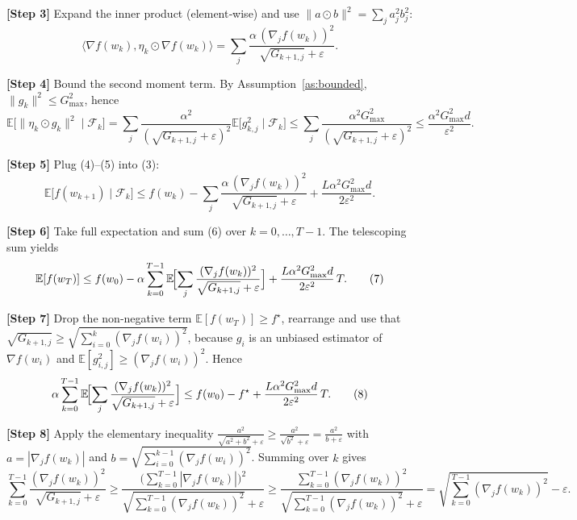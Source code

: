 \documentclass{article}
\newcommand{\E}{\mathbb{E}}
\begin{document}
\noindent\textbf{[Step 3]} Expand the inner product (element‑wise) and use
$\|a\odot b\|^{2}=\sum_{j}a_{j}^{2}b_{j}^{2}$:
\[
\langle\nabla f(w_{k}),\eta_{k}\odot\nabla f(w_{k})\rangle
   =\sum_{j}\frac{\alpha\,(\nabla_{j}f(w_{k}))^{2}}
                {\sqrt{G_{k+1,j}}+\varepsilon}.                                   \tag{4}
\]

\noindent\textbf{[Step 4]} Bound the second moment term.  By Assumption~\ref{as:bounded},
$\|g_{k}\|^{2}\le G_{\max}^{2}$, hence
\[
\E\!\bigl[\|\eta_{k}\odot g_{k}\|^{2}\mid\mathcal{F}_{k}\bigr]
   =\sum_{j}\frac{\alpha^{2}}{(\sqrt{G_{k+1,j}}+\varepsilon)^{2}}
          \E\!\bigl[g_{k,j}^{2}\mid\mathcal{F}_{k}\bigr]
   \le\sum_{j}\frac{\alpha^{2}G_{\max}^{2}}{(\sqrt{G_{k+1,j}}+\varepsilon)^{2}}
   \le\frac{\alpha^{2}G_{\max}^{2}d}{\varepsilon^{2}}.                              \tag{5}
\]

\noindent\textbf{[Step 5]} Plug (4)–(5) into (3):
\[
\E\!\bigl[f(w_{k+1})\mid\mathcal{F}_{k}\bigr]
\le f(w_{k})
   -\sum_{j}\frac{\alpha\,(\nabla_{j}f(w_{k}))^{2}}
                {\sqrt{G_{k+1,j}}+\varepsilon}
   +\frac{L\alpha^{2}G_{\max}^{2}d}{2\varepsilon^{2}}.                              \tag{6}
\]

\noindent\textbf{[Step 6]} Take full expectation and sum (6) over $k=0,\dots,T-1$.
The telescoping sum yields
\[
\E[f(w_{T})]
\le f(w_{0})
   -\alpha\sum_{k=0}^{T-1}\E\!\Bigl[
        \sum_{j}\frac{(\nabla_{j}f(w_{k}))^{2}}
                     {\sqrt{G_{k+1,j}}+\varepsilon}
        \Bigr]
   +\frac{L\alpha^{2}G_{\max}^{2}d}{2\varepsilon^{2}}\,T .                         \tag{7}
\]

\noindent\textbf{[Step 7]} Drop the non‑negative term $\E[f(w_{T})]\ge f^{\star}$,
rearrange and use that $\sqrt{G_{k+1,j}}\ge\sqrt{\sum_{i=0}^{k}(\nabla_{j}f(w_{i}))^{2}}$,
because $g_{i}$ is an unbiased estimator of $\nabla f(w_{i})$ and
$\E[g_{i,j}^{2}]\ge(\nabla_{j}f(w_{i}))^{2}$.  Hence
\[
\alpha\sum_{k=0}^{T-1}\E\!\Bigl[
        \sum_{j}\frac{(\nabla_{j}f(w_{k}))^{2}}
                     {\sqrt{G_{k+1,j}}+\varepsilon}
        \Bigr]
\le f(w_{0})-f^{\star}
   +\frac{L\alpha^{2}G_{\max}^{2}d}{2\varepsilon^{2}}\,T .                         \tag{8}
\]

\noindent\textbf{[Step 8]} Apply the elementary inequality
$\displaystyle\frac{a^{2}}{\sqrt{a^{2}+b^{2}}+\varepsilon}
        \ge\frac{a^{2}}{\sqrt{b^{2}}+\varepsilon}
        =\frac{a^{2}}{b+\varepsilon}$ with $a=|\nabla_{j}f(w_{k})|$ and
$b=\sqrt{\sum_{i=0}^{k-1}(\nabla_{j}f(w_{i}))^{2}}$.
Summing over $k$ gives
\[
\sum_{k=0}^{T-1}\frac{(\nabla_{j}f(w_{k}))^{2}}
                     {\sqrt{G_{k+1,j}}+\varepsilon}
\ge
\frac{\bigl(\sum_{k=0}^{T-1}|\nabla_{j}f(w_{k})|\bigr)^{2}}
     {\sqrt{\sum_{k=0}^{T-1}(\nabla_{j}f(w_{k}))^{2}}+\varepsilon}
\ge
\frac{\sum_{k=0}^{T-1}(\nabla_{j}f(w_{k}))^{2}}
     {\sqrt{\sum_{k=0}^{T-1}(\nabla_{j}f(w_{k}))^{2}}+\varepsilon}
= \sqrt{\sum_{k=0}^{T-1}(\nabla_{j}f(w_{k}))^{2}}
   -\varepsilon .                                                                \tag{9}
\]
\end{document}
